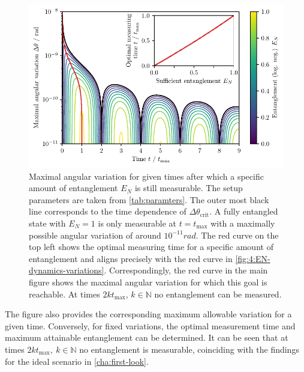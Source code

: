\begin{figure}[!htbp]
  \centering
  \includegraphics[width=\textwidth]{./../figures/theta-variance/time-delta-theta-crit-EN.pdf}
  \caption{Maximal angular variation for given times after which a specific amount of entanglement $E_N$ is still measurable. The setup parameters are taken from \cref{tab:paramters}. The outer most black line corresponds to the time dependence of $\Delta \theta_\mathrm{crit}$. A fully entangled state with $E_N=1$ is only measurable at $t=t_\mathrm{max}$ with a maximally possible angular variation of around $10^{-11}\si{rad}$. The red curve on the top left shows the optimal measuring time for a specific amount of entanglement and aligns precisely with the red curve in \cref{fig:4:EN-dynamics-variations}. Correspondingly, the red curve in the main figure shows the maximal angular variation for which this goal is reachable. At times $2k t_\mathrm{max},\,k\in\mathbb{N}$ no entanglement can be measured.}
  \label{fig:4:time-delta-theta}
\end{figure}
The figure also provides the corresponding maximum allowable variation for a given time. Conversely, for fixed variations, the optimal measurement time and maximum attainable entanglement can be determined.
It can be seen that at times $2k t_\mathrm{max}, \ k\in\mathbb{N}$ no entanglement is measurable, coinciding with the findings for the ideal scenario in \cref{cha:first-look}. 
